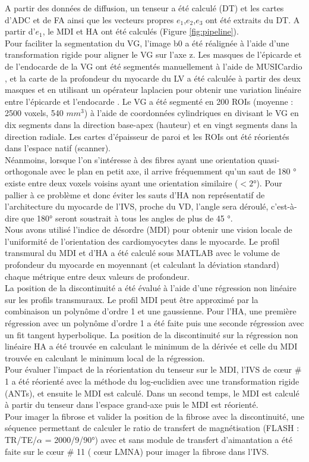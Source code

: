 A partir des données de diffusion, un tenseur a été calculé (DT) et les cartes d’ADC et de FA ainsi que les vecteurs propres $e_1$,$e_2$,$e_3$ ont été extraits du DT. A partir d’$e_1$, le MDI et HA ont été calculés (Figure \ref{fig:pipeline}).
\\
Pour faciliter la segmentation du VG, l’image b0 a été réalignée à l'aide d'une transformation rigide pour aligner le VG sur l'axe z. Les masques de l'épicarde et de l'endocarde de la VG ont été segmentés manuellement à l'aide de MUSICardio \cite{Merle2022}, et la carte de la profondeur du myocarde du LV a été calculée à partir des deux masques et en utilisant un opérateur laplacien pour obtenir une variation linéaire entre l’épicarde et l’endocarde \cite{Jones2000}. Le VG a été segmenté en 200 ROIs (moyenne : 2500 voxels, 540 $mm^3$) à l'aide de coordonnées cylindriques en divisant le VG en dix segments dans la direction base-apex (hauteur) et en vingt segments dans la direction radiale. Les cartes d'épaisseur de paroi et les ROIs ont été réorientés dans l'espace natif (scanner).
\\
Néanmoins, lorsque l’on s’intéresse à des fibres ayant une orientation quasi-orthogonale avec le plan en petit axe, il arrive fréquemment qu’un saut de 180 ° existe entre deux voxels voisins ayant une orientation similaire ($ < 2°$). Pour pallier à ce problème et donc éviter les sauts d’HA non représentatif de l’architecture du myocarde de l’IVS, proche du VD, l’angle sera déroulé, c’est-à-dire que 180° seront soustrait à tous les angles de plus de 45 °. 
\\
Nous avons utilisé l’indice de désordre (MDI) pour obtenir une vision locale de l’uniformité de l’orientation des cardiomyocytes dans le myocarde. Le profil transmural du MDI et d’HA a été calculé sous MATLAB avec le volume de profondeur du myocarde en moyennant (et calculant la déviation standard) chaque métrique entre deux valeurs de profondeur. 
\\
La position de la discontinuité a été évalué à l’aide d’une régression non linéaire sur les profils transmuraux. Le profil MDI peut être approximé par la combinaison un polynôme d’ordre 1 et une gaussienne. Pour l’HA, une première régression avec un polynôme d’ordre 1 a été faite puis une seconde régression avec un fit tangent hyperbolique. La position de la discontinuité sur la régression non linéaire HA a été trouvée en calculant le minimum de la dérivée et celle du MDI trouvée en calculant le minimum local de la régression.
\\
Pour évaluer l’impact de la réorientation du tenseur sur le MDI, l’IVS de cœur \# 1 a été réorienté avec la méthode du log-euclidien avec une transformation rigide (ANTs), et ensuite le MDI est calculé. Dans un second temps, le MDI est calculé à partir du tenseur dans l’espace grand-axe puis le MDI est réorienté.
\\
Pour imager la fibrose et valider la position de la fibrose avec la discontinuité, une séquence permettant de calculer le ratio de transfert de magnétisation (FLASH : TR/TE/$\alpha$ = 2000/9/90°) avec et sans module de transfert d’aimantation \cite{Haliot2021} a été faite sur le cœur \# 11 ( cœur LMNA) pour imager la fibrose dans l’IVS. 

